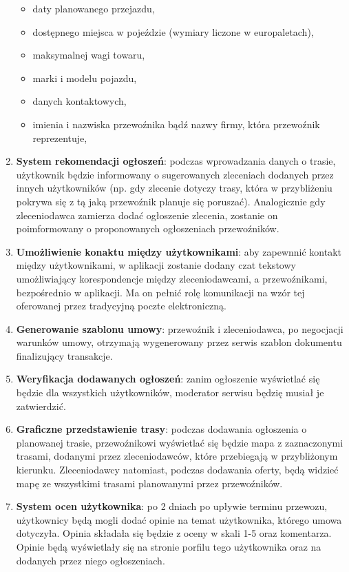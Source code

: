 \begin{enumerate}
\begin{itemize}
        \item daty planowanego przejazdu,
        \item dostępnego miejsca w pojeździe (wymiary liczone w europaletach),
        \item maksymalnej wagi towaru,
        \item marki i modelu pojazdu,
        \item danych kontaktowych,
        \item imienia i nazwiska przewoźnika bądź nazwy firmy, która przewoźnik reprezentuje,
    \end{itemize}
    \item \textbf{System rekomendacji ogłoszeń}: podczas wprowadzania danych o trasie, użytkownik będzie informowany o sugerowanych zleceniach dodanych przez innych użytkowników (np. gdy zlecenie dotyczy trasy, która w przybliżeniu pokrywa się z tą jaką przewoźnik planuje się poruszać). Analogicznie gdy zleceniodawca zamierza dodać ogłoszenie zlecenia, zostanie on poimformowany o proponowanych ogłoszeniach przewoźników.
    \item \textbf{Umożliwienie konaktu między użytkownikami}: aby zapewnnić kontakt między użytkownikami, w aplikacji zostanie dodany czat tekstowy umożliwiający korespondencje między zleceniodawcami, a przewoźnikami, bezpośrednio w aplikacji. Ma on pełnić rolę komunikacji na wzór tej  oferowanej przez tradycyjną poczte elektroniczną.
    \item \textbf{Generowanie szablonu umowy}: przewoźnik i zleceniodawca, po negocjacji warunków umowy, otrzymają wygenerowany przez serwis szablon dokumentu finalizujący transakcje.
    \item \textbf{Weryfikacja dodawanych ogłoszeń}: zanim ogłoszenie wyświetlać się będzie dla wszystkich użytkowników, moderator serwisu będzię musiał je zatwierdzić.
    \item \textbf{Graficzne przedstawienie trasy}: podczas dodawania ogłoszenia o planowanej trasie, przewoźnikowi wyświetlać się będzie mapa z zaznaczonymi trasami, dodanymi przez zleceniodawców, które przebiegają w przybliżonym kierunku. Zleceniodawcy natomiast, podczas dodawania oferty, będą widzieć mapę ze wszystkimi trasami planowanymi przez przewoźników.
    \item \textbf{System ocen użytkownika}: po 2 dniach po upływie terminu przewozu, użytkownicy będą mogli dodać opinie na temat użytkownika, którego umowa dotyczyła. Opinia składała się będzie z oceny w skali 1-5 oraz komentarza. Opinie będą wyświetlały się na stronie porfilu tego użytkownika oraz na dodanych przez niego ogłoszeniach.
\end{enumerate}
